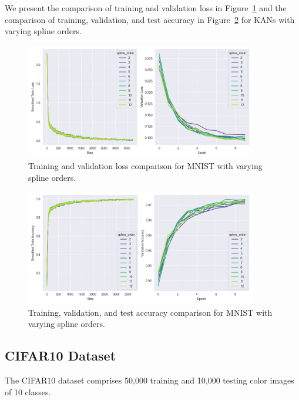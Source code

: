 \documentclass{article}
\begin{document}
We present the comparison of training and validation loss in Figure~\ref{fig:mnist_loss_spline_order}
and the comparison of training, validation, and test accuracy in Figure~\ref{fig:mnist_accuracy_spline_order} for KANs with varying spline orders.

\begin{figure}[H]
    \centering
    \includegraphics[width=0.9\textwidth]{pics/mnist_loss_spline_order}
    \caption{Training and validation loss comparison for MNIST with varying spline orders.}
    \label{fig:mnist_loss_spline_order}
\end{figure}

\begin{figure}[H]
    \centering
    \includegraphics[width=0.9\textwidth]{pics/mnist_accuracy_spline_order}
    \caption{Training, validation, and test accuracy comparison for MNIST with varying spline orders.}
    \label{fig:mnist_accuracy_spline_order}
\end{figure}


\subsection{CIFAR10 Dataset}\label{subsec:cifar10}

The CIFAR10 dataset comprises 50,000 training and 10,000 testing color images of 10 classes.
\end{document}
